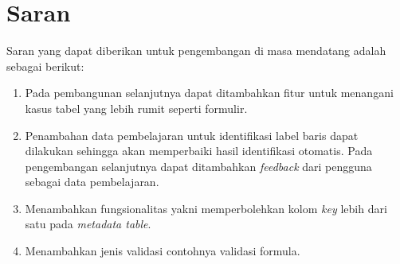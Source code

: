 \section{Saran}
Saran yang dapat diberikan untuk pengembangan di masa mendatang adalah sebagai berikut:
\begin{enumerate}
	\item Pada pembangunan selanjutnya dapat ditambahkan fitur untuk menangani kasus tabel yang lebih rumit seperti formulir.
	\item Penambahan data pembelajaran untuk identifikasi label baris dapat dilakukan sehingga akan memperbaiki hasil identifikasi otomatis. Pada pengembangan selanjutnya dapat ditambahkan \textit{feedback} dari pengguna sebagai data pembelajaran.
	\item Menambahkan fungsionalitas yakni memperbolehkan kolom \textit{key} lebih dari satu pada \textit{metadata table}.
	\item Menambahkan jenis validasi contohnya validasi formula.
\end{enumerate}